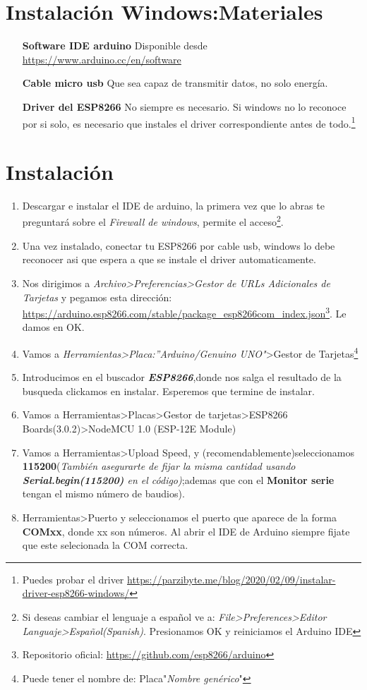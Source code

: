 \documentclass[11pt,fleqn]{book} %
\begin{document}
\section{Instalación Windows:Materiales}
\begin{enumerate}
\item[\textbf{Software IDE arduino}] Disponible desde \url{https://www.arduino.cc/en/software}
\item[\textbf{Cable micro usb}] Que sea capaz de transmitir datos, no solo energía.
\item[\textbf{Driver del ESP8266}] No siempre es necesario. Si windows no lo reconoce por si solo, es necesario que instales el driver correspondiente antes de todo.\footnote{Puedes probar el driver \url{https://parzibyte.me/blog/2020/02/09/instalar-driver-esp8266-windows/} }
\end{enumerate}
\section{Instalación}
\begin{enumerate}
\item Descargar e instalar el IDE de arduino, la primera vez que lo abras te preguntará sobre el \textit{Firewall de windows}, permite el acceso\footnote{Si deseas cambiar el lenguaje a español ve a: \textit{File>Preferences>Editor Languaje>Español(Spanish)}. Presionamos OK y reiniciamos el Arduino IDE}.
\item Una vez instalado, conectar tu ESP8266 por cable usb, windows lo debe reconocer asi que espera a que se instale el driver automaticamente.
\item Nos dirigimos a \textit{Archivo>Preferencias>Gestor de URLs Adicionales de Tarjetas} y pegamos esta dirección: \url{https://arduino.esp8266.com/stable/package_esp8266com_index.json}\footnote{Repositorio oficial: \url{https://github.com/esp8266/arduino}}. Le damos en OK.
\item Vamos a \textit{Herramientas>Placa:''Arduino/Genuino UNO"}>Gestor de Tarjetas\footnote{Puede tener el nombre de: Placa"\textit{Nombre genérico}"}
\item Introducimos en el buscador \textbf{\textit{ESP8266}},donde nos salga el resultado de la busqueda clickamos en instalar. Esperemos que termine de instalar.
\item Vamos a Herramientas>Placas>Gestor de tarjetas>ESP8266 Boards(3.0.2)>NodeMCU 1.0 (ESP-12E Module)
\item Vamos a Herramientas>Upload Speed, y (recomendablemente)seleccionamos \textbf{115200}(\textit{También asegurarte de fijar la misma cantidad usando \textbf{Serial.begin(115200)}  en el código)};ademas que con el \textbf{Monitor serie} tengan el mismo número de baudios).
\item Herramientas>Puerto y seleccionamos el puerto que aparece de la forma \textbf{COMxx}, donde xx son números. Al abrir el IDE de Arduino siempre fijate que este selecionada la COM correcta.
\end{enumerate}
\end{document}
